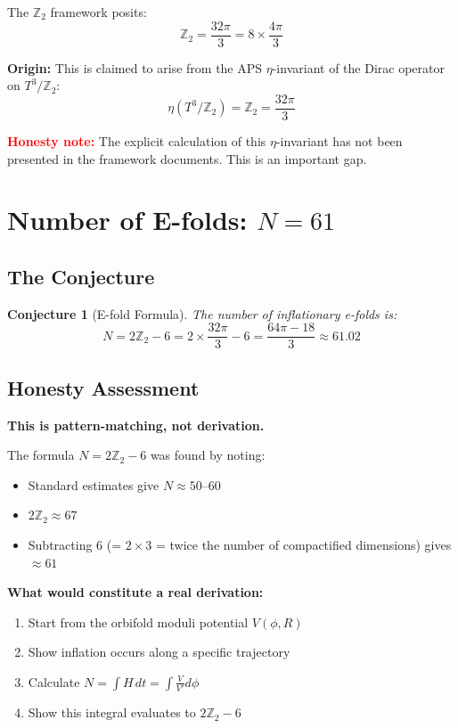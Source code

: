 \documentclass[12pt,a4paper]{article}
\newtheorem{conjecture}{Conjecture}
\begin{document}
The $\mathbb{Z}_2$ framework posits:
\begin{equation}
\mathbb{Z}_2 = \frac{32\pi}{3} = 8 \times \frac{4\pi}{3}
\end{equation}

\textbf{Origin:} This is claimed to arise from the APS $\eta$-invariant of the Dirac operator on $T^3/\mathbb{Z}_2$:
\begin{equation}
\eta(T^3/\mathbb{Z}_2) = \mathbb{Z}_2 = \frac{32\pi}{3}
\end{equation}

\textcolor{red}{\textbf{Honesty note:}} The explicit calculation of this $\eta$-invariant has not been presented in the framework documents. This is an important gap.

\section{Number of E-folds: $N = 61$}

\subsection{The Conjecture}

\begin{conjecture}[E-fold Formula]
The number of inflationary e-folds is:
\begin{equation}
N = 2\mathbb{Z}_2 - 6 = 2 \times \frac{32\pi}{3} - 6 = \frac{64\pi - 18}{3} \approx 61.02
\end{equation}
\end{conjecture}

\subsection{Honesty Assessment}

\textbf{This is pattern-matching, not derivation.}

The formula $N = 2\mathbb{Z}_2 - 6$ was found by noting:
\begin{itemize}
    \item Standard estimates give $N \approx 50$--$60$
    \item $2\mathbb{Z}_2 \approx 67$
    \item Subtracting 6 (= $2 \times 3$ = twice the number of compactified dimensions) gives $\approx 61$
\end{itemize}

\textbf{What would constitute a real derivation:}
\begin{enumerate}
    \item Start from the orbifold moduli potential $V(\phi, R)$
    \item Show inflation occurs along a specific trajectory
    \item Calculate $N = \int H\,dt = \int \frac{V}{V'} d\phi$
    \item Show this integral evaluates to $2\mathbb{Z}_2 - 6$
\end{enumerate}
\end{document}

